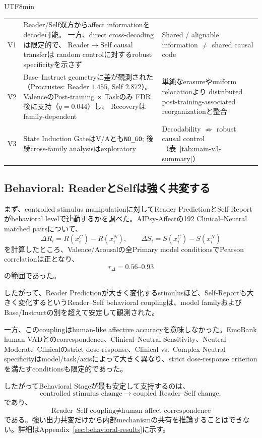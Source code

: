 \documentclass{article} %
\begin{document}
\begin{CJK*}{UTF8}{min}
\begin{table}[t]
\begin{tabularx}{\linewidth}{
@{}
>{\raggedright\arraybackslash}p{1.25cm}
>{\raggedright\arraybackslash}p{4.1cm}
>{\raggedright\arraybackslash}X
@{}
}
V1 &
Reader/Self双方からaffect informationをdecode可能。
一方、direct cross-decodingは限定的で、
Reader$\rightarrow$Self causal transferは
random controlに対するrobust specificityを示さず &
Shared / alignable information
$\neq$
shared causal code \\

V2 &
Base--Instruct geometryに差が観測された
（Procrustes: Reader $1.455$,
Self $2.872$）。
ValenceのPost-training $\times$ Taskのみ
FDR後に支持（$q=0.044$）し、
Recoveryはfamily-dependent &
単純なerasureやuniform relocationより
distributed post-training-associated
reorganizationと整合 \\

V3 &
State Induction GateはV/Aとも\texttt{NO\_GO};
後続cross-family analysisはexploratory &
Decodability
$\not\Rightarrow$
robust causal control
（表~\ref{tab:main-v3-summary}） \\

\bottomrule
\end{tabularx}
\end{table}


\subsection{Behavioral: ReaderとSelfは強く共変する}

まず、controlled stimulus manipulationに対してReader PredictionとSelf-Reportがbehavioral levelで連動するかを調べた。AIPsy-Affectの192 Clinical--Neutral matched pairsについて、
\[
\Delta R_i=R(x_i^C)-R(x_i^N),
\qquad
\Delta S_i=S(x_i^C)-S(x_i^N)
\]
を計算したところ、Valence/Arousalの全Primary model conditionsでPearson correlationは正となり、
\[
r_{\Delta}=0.56\text{--}0.93
\]
の範囲であった。

したがって、Reader Predictionが大きく変化するstimulusほど、Self-Reportも大きく変化するというReader--Self behavioral couplingは、model familyおよびBase/Instructの別を超えて安定して観測された。

一方、このcouplingはhuman-like affective accuracyを意味しなかった。EmoBank human VADとのcorrespondence、Clinical--Neutral Sensitivity、Neutral--Moderate--Clinicalのstrict dose-response、Clinical vs.\ Complex Neutral specificityはmodel/task/axisによって大きく異なり、strict dose-response criterionを満たすconditionsも限定的であった。

したがってBehavioral Stageが最も安定して支持するのは、
\[
\text{controlled stimulus change}
\rightarrow
\text{coupled Reader--Self change},
\]
であり、
\[
\text{Reader--Self coupling}
\neq
\text{human-affect correspondence}
\]
である。強い出力共変だけから内部mechanismの共有を推論することはできない。詳細はAppendix~\ref{sec:behavioral-results}に示す。



\end{CJK*}
\end{document}
